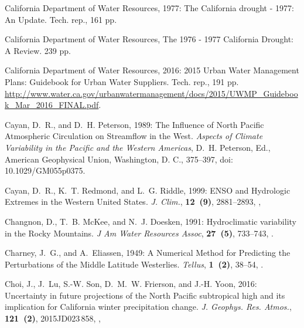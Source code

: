 \documentclass[final, double]{ua-thesis}
\begin{document}
\begin{thebibliography}{}
{California Department of Water Resources}, 1977: The {California} drought -
  1977: {An} {Update}. Tech. rep., 161 pp.
  
{California Department of Water
  Resources}, The 1976 - 1977 {California} {Drought}: {A} {Review}. 239 pp.

{California Department of Water Resources}, 2016: 2015 {Urban} {Water}
  {Management} {Plans}: {Guidebook} for {Urban} {Water} {Suppliers}. Tech.
  rep., 191 pp.
  \urlprefix\url{http://www.water.ca.gov/urbanwatermanagement/docs/2015/UWMP_Guidebook_Mar_2016_FINAL.pdf}.

Cayan, D.~R., and D.~H. Peterson, 1989: The {Influence} of {North} {Pacific}
  {Atmospheric} {Circulation} on {Streamflow} in the {West}. \textit{Aspects of
  {Climate} {Variability} in the {Pacific} and the {Western} {Americas}}, D.~H.
  Peterson, Ed., American Geophysical Union, Washington, D. C., 375--397,
  doi: 10.1029/GM055p0375.

Cayan, D.~R., K.~T. Redmond, and L.~G. Riddle, 1999: {ENSO} and {Hydrologic}
  {Extremes} in the {Western} {United} {States}. \textit{J. Clim.},
  \textbf{12~(9)}, 2881--2893,
  ,

Changnon, D., T.~B. McKee, and N.~J. Doesken, 1991: Hydroclimatic variability
  in the {Rocky} {Mountains}. \textit{J Am Water Resources Assoc},
  \textbf{27~(5)}, 733--743, .

Charney, J.~G., and A.~Eliassen, 1949: A {Numerical} {Method} for {Predicting}
  the {Perturbations} of the {Middle} {Latitude} {Westerlies}. \textit{Tellus},
  \textbf{1~(2)}, 38--54, .

Choi, J., J.~Lu, S.-W. Son, D.~M.~W. Frierson, and J.-H. Yoon, 2016:
  Uncertainty in future projections of the {North} {Pacific} subtropical high
  and its implication for {California} winter precipitation change. \textit{J.
  Geophys. Res. Atmos.}, \textbf{121~(2)}, 2015JD023\,858,
  ,


\end{thebibliography}
\end{document}
